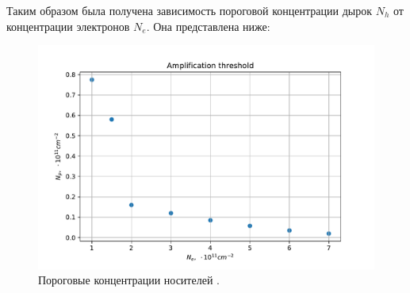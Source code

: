 \documentclass[../main.tex]{subfiles}
\begin{document}
    Таким образом была получена зависимость пороговой концентрации дырок 
    $N_h$ от концентрации электронов $N_e$. Она представлена ниже:

    \begin{figure}[h]
        \begin{minipage}[h]{1\textwidth}
            \includegraphics[width=1\textwidth]{./images/threshold_6nm_42K.pdf}
            \caption{Пороговые концентрации носителей \label{plasmon:threshold_42}.}
        \end{minipage}
    \end{figure}
\end{document}
